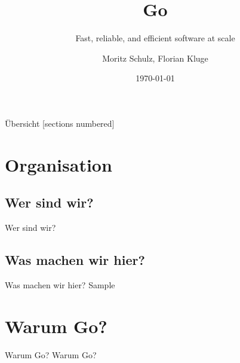 

\usepackage{tikz}
\usepackage{hyperref}
\hypersetup{
	colorlinks=true,
	linkcolor=darkgray,
	urlcolor=blue,
}


\title{Go}
\subtitle{Fast, reliable, and efficient software at scale}
\date{\today}
\author{Moritz Schulz, Florian Kluge}


\maketitle


\begin{frame}{Übersicht}
	[sections numbered]
	\tableofcontents[hideallsubsections]
\end{frame}



\section{Organisation}

\subsection{Wer sind wir?}
\begin{frame}{Wer sind wir?}

\end{frame}

\subsection{Was machen wir hier?}
\begin{frame}{Was machen wir hier?}
	Sample
\end{frame}



\section{Warum Go?}
\begin{frame}{Warum Go?}
	Warum Go?
\end{frame}


